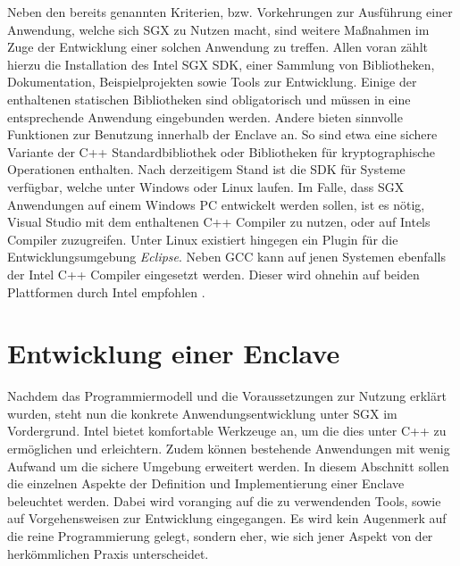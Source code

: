 Neben den bereits genannten Kriterien, bzw. Vorkehrungen zur Ausführung einer Anwendung, welche sich \ac{SGX} zu Nutzen macht, sind weitere Maßnahmen im Zuge der Entwicklung einer solchen Anwendung zu treffen. Allen voran zählt hierzu die Installation des Intel \ac{SGX} \ac{SDK}, einer Sammlung von Bibliotheken, Dokumentation, Beispielprojekten sowie Tools zur Entwicklung. Einige der enthaltenen statischen Bibliotheken sind obligatorisch und müssen in eine entsprechende Anwendung eingebunden werden. Andere bieten sinnvolle Funktionen zur Benutzung innerhalb der Enclave an. So sind etwa eine sichere Variante der C++ Standardbibliothek oder Bibliotheken für kryptographische Operationen enthalten. Nach derzeitigem Stand ist die SDK für Systeme verfügbar, welche unter Windows oder Linux laufen. Im Falle, dass \ac{SGX} Anwendungen auf einem Windows PC entwickelt werden sollen, ist es nötig, Visual Studio mit dem enthaltenen C++ Compiler zu nutzen, oder auf Intels Compiler zuzugreifen. Unter Linux existiert hingegen ein Plugin für die Entwicklungsumgebung \textit{Eclipse}. Neben GCC kann auf jenen Systemen ebenfalls der Intel C++ Compiler eingesetzt werden. Dieser wird ohnehin auf beiden Plattformen durch Intel empfohlen \cite{WinDev}.

\section{Entwicklung einer Enclave}

Nachdem das Programmiermodell und die Voraussetzungen zur Nutzung erklärt wurden, steht nun die konkrete Anwendungsentwicklung unter \ac{SGX} im Vordergrund. Intel bietet komfortable Werkzeuge an, um die dies unter C++ zu ermöglichen und erleichtern. Zudem können bestehende Anwendungen mit wenig Aufwand um die sichere Umgebung erweitert werden. In diesem Abschnitt sollen die einzelnen Aspekte der Definition und Implementierung einer Enclave beleuchtet werden. Dabei wird voranging auf die zu verwendenden Tools, sowie auf Vorgehensweisen zur Entwicklung eingegangen. Es wird kein Augenmerk auf die reine Programmierung gelegt, sondern eher, wie sich jener Aspekt von der herkömmlichen Praxis unterscheidet.

